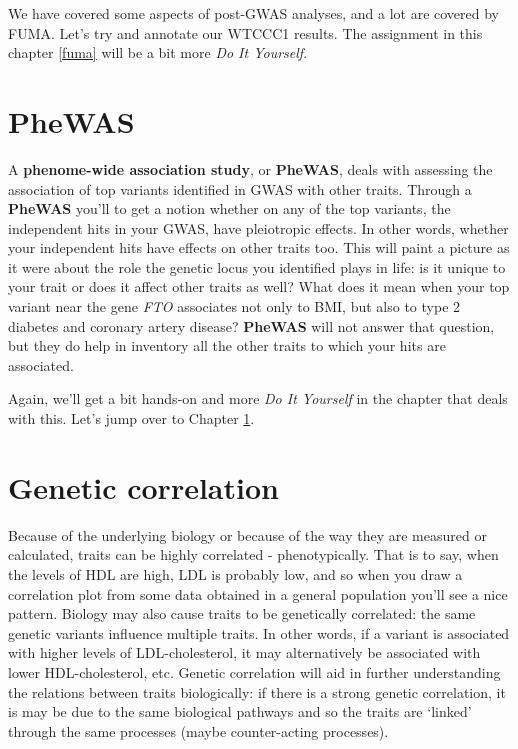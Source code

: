 \documentclass[
]{book}
\begin{document}
We have covered some aspects of post-GWAS analyses, and a lot are covered by FUMA. Let's try and annotate our WTCCC1 results. The assignment in this chapter \ref{fuma} will be a bit more \emph{Do It Yourself}.

\hypertarget{phewas}{%
\section{PheWAS}\label{phewas}}

A \textbf{phenome-wide association study}, or \textbf{PheWAS}, deals with assessing the association of top variants identified in GWAS with other traits. Through a \textbf{PheWAS} you'll to get a notion whether on any of the top variants, the independent hits in your GWAS, have pleiotropic effects. In other words, whether your independent hits have effects on other traits too. This will paint a picture as it were about the role the genetic locus you identified plays in life: is it unique to your trait or does it affect other traits as well? What does it mean when your top variant near the gene \emph{FTO} associates not only to BMI, but also to type 2 diabetes and coronary artery disease? \textbf{PheWAS} will not answer that question, but they do help in inventory all the other traits to which your hits are associated.

Again, we'll get a bit hands-on and more \emph{Do It Yourself} in the chapter that deals with this. Let's jump over to Chapter \ref{phewas}.

\hypertarget{genetic-correlation}{%
\section{Genetic correlation}\label{genetic-correlation}}

Because of the underlying biology or because of the way they are measured or calculated, traits can be highly correlated - phenotypically. That is to say, when the levels of HDL are high, LDL is probably low, and so when you draw a correlation plot from some data obtained in a general population you'll see a nice pattern. Biology may also cause traits to be genetically correlated: the same genetic variants influence multiple traits. In other words, if a variant is associated with higher levels of LDL-cholesterol, it may alternatively be associated with lower HDL-cholesterol, etc. Genetic correlation will aid in further understanding the relations between traits biologically: if there is a strong genetic correlation, it is may be due to the same biological pathways and so the traits are `linked' through the same processes (maybe counter-acting processes).
\end{document}
